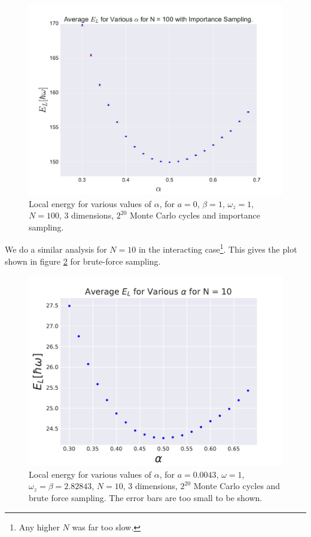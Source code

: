 \documentclass[a4paper, 10pt]{article}
\begin{document}
		\begin{figure}[ht!]
			\centering
			\includegraphics[scale=0.8]{../Results/N100ax20/EvAlphaN100IS.pdf}
			\caption{Local energy for various values of $\alpha$, for $a=0$, $\beta=1$, $\omega_z=1$, $N=100$, 3 dimensions, $2^{20}$ Monte Carlo cycles and importance sampling.}\label{fig:Average_EL_N=100_importance}
		\end{figure}
	We do a similar analysis for $N=10$ in the interacting case\footnote{Any higher $N$ was far too slow.}. This gives the plot shown in figure \ref{fig:EL_alpha_N10_interacting} for brute-force sampling.
			\begin{figure}[ht!]
				\centering
				\includegraphics[scale=0.8]{../Results/Alpha_v_EL_Interacting_N10.pdf}
				\caption{Local energy for various values of $\alpha$, for $a=0.0043$, $\omega=1$, $\omega_z=\beta=2.82843$, $N=10$, 3 dimensions, $2^{20}$ Monte Carlo cycles and brute force sampling. The error bars are too small to be shown.}\label{fig:EL_alpha_N10_interacting}
			\end{figure}
\end{document}
